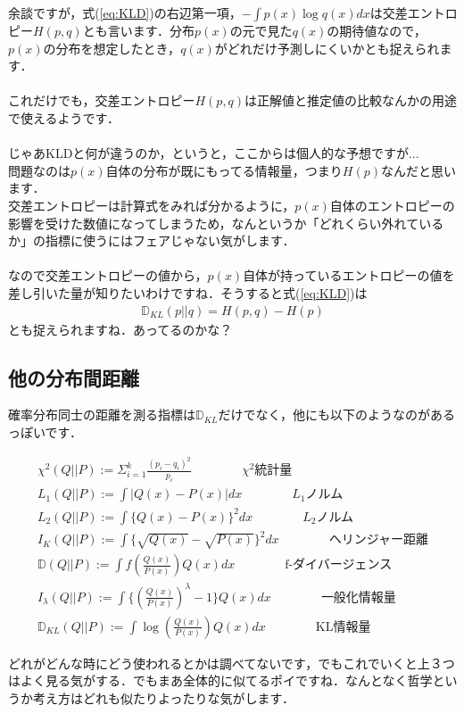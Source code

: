 \documentclass[11pt,a4paper,dvipdfmx]{ujreport}
\begin{document}
余談ですが，式(\ref{eq:KLD})の右辺第一項，$- \int p(x) \log q(x)dx$は交差エントロピー$H(p,q)$とも言います．分布$p(x)$の元で見た$q(x)$の期待値なので，$p(x)$の分布を想定したとき，$q(x)$がどれだけ予測しにくいかとも捉えられます．\\
\\

これだけでも，交差エントロピー$H(p,q)$は正解値と推定値の比較なんかの用途で使えるようです．\\
\\

じゃあKLDと何が違うのか，というと，ここからは個人的な予想ですが...\\

問題なのは$p(x)$自体の分布が既にもってる情報量，つまり$H(p)$なんだと思います．\\

交差エントロピーは計算式をみれば分かるように，$p(x)$自体のエントロピーの影響を受けた数値になってしまうため，なんというか「どれくらい外れているか」の指標に使うにはフェアじゃない気がします．\\
\\

なので交差エントロピーの値から，$p(x)$自体が持っているエントロピーの値を差し引いた量が知りたいわけですね．そうすると式(\ref{eq:KLD})は
\begin{eqnarray}
\mathbb{D}_{KL}(p||q) = H(p,q) - H(p)
\end{eqnarray}
とも捉えられますね．あってるのかな？

\subsection{他の分布間距離}
確率分布同士の距離を測る指標は$\mathbb{D}_{KL}$だけでなく，他にも以下のようなのがあるっぽいです\cite{dist}．
\begin{screen}
\begin{eqnarray}
\chi^2(Q||P) := \Sigma_{i=1}^k \frac{(p_i - q_i)^2}{p_i} \qquad \qquad  \text{$\chi^2$統計量}\\
L_1(Q||P) := \int |Q(x) - P(x)|dx   \qquad \qquad  \text{$L_1$ノルム} \\
L_2(Q||P) := \int\{ Q(x) - P(x)\}^2 dx   \qquad \qquad  \text{$L_2$ノルム}\\
I_K(Q||P) := \int \{ \sqrt{Q(x)} - \sqrt{P(x)} \}^2 dx    \qquad \qquad  \text{ヘリンジャー距離}\\
\mathbb{D}(Q||P) := \int f(\frac{Q(x)}{P(x)}) Q(x)dx   \qquad \qquad  \text{f-ダイバージェンス}\\
I_\lambda(Q||P) := \int \{ (\frac{Q(x)}{P(x)})^{\lambda} -1 \}Q(x) dx   \qquad \qquad  \text{一般化情報量}\\
\mathbb{D}_{KL}(Q||P) := \int \log(\frac{Q(x)}{P(x)})Q(x) dx   \qquad \qquad  \text{KL情報量}
\end{eqnarray}
\end{screen}
どれがどんな時にどう使われるとかは調べてないです，でもこれでいくと上３つはよく見る気がする．でもまあ全体的に似てるポイですね．なんとなく哲学というか考え方はどれも似たりよったりな気がします．
\end{document}
